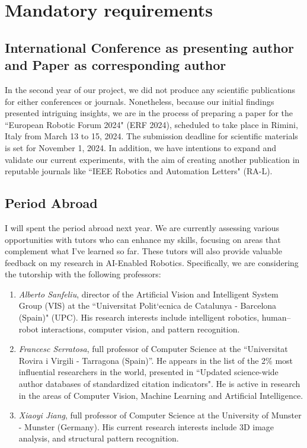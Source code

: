 \section{Mandatory requirements}

\subsection{International Conference as presenting author and Paper as corresponding author}
In the second year of our project, we did not produce any scientific publications for either conferences or journals. Nonetheless, because our initial findings presented intriguing insights, we are in the process of preparing a paper for the ``European Robotic Forum 2024" (ERF 2024), scheduled to take place in Rimini, Italy from March 13 to 15, 2024. The submission deadline for scientific materials is set for November 1, 2024.
In addition, we have intentions to expand and validate our current experiments, with the aim of creating another publication in reputable journals like ``IEEE Robotics and Automation Letters" (RA-L).

\subsection{Period Abroad}
I will spent the period abroad next year. We are currently assessing various opportunities with tutors who can enhance my skills, focusing on areas that complement what I've learned so far. These tutors will also provide valuable feedback on my research in AI-Enabled Robotics. Specifically, we are considering the tutorship with the following professors:
\begin{enumerate}
    \item \textit{Alberto Sanfeliu}, director of the Artificial Vision and Intelligent System Group (VIS) at the ``Universitat Polit`ecnica de Catalunya - Barcelona (Spain)" (UPC).  His research interests include intelligent robotics, human–robot interactions, computer vision, and pattern recognition.
    \item \textit{Francesc Serratosa}, full professor of Computer Science at the ``Universitat Rovira i Virgili - Tarragona (Spain)''. He appears in the list of the 2\% most influential researchers in the world, presented in ``Updated science-wide author databases of standardized citation indicators". He is active in research in the areas of Computer Vision, Machine Learning and Artificial Intelligence.
    \item \textit{Xiaoyi Jiang}, full professor of Computer Science at the University of Munster - Munster (Germany). His current research interests include 3D image analysis, and structural pattern recognition.
\end{enumerate}